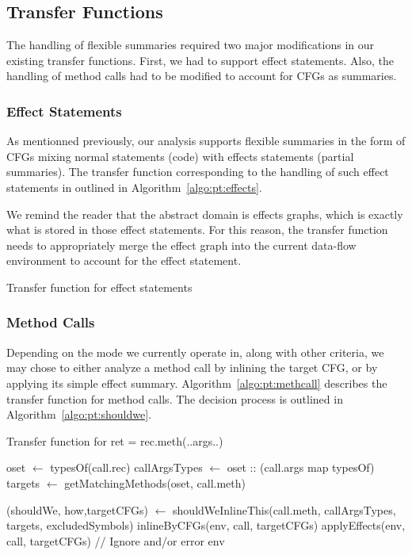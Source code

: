 \documentclass[a4paper]{article}
\begin{document}
\subsection{Transfer Functions}
The handling of flexible summaries required two major modifications in our
existing transfer functions. First, we had to support effect statements.
Also, the handling of method calls had to be modified to account for CFGs as
summaries.

\subsubsection{Effect Statements}
As mentionned previously, our analysis supports flexible summaries in the form
of CFGs mixing normal statements (code) with effects statements (partial
summaries). The transfer function corresponding to the handling of such effect
statements in outlined in Algorithm~\ref{algo:pt:effects}.

We remind the reader that the abstract domain is effects graphs, which is
exactly what is stored in those effect statements. For this reason, the
transfer function needs to appropriately merge the effect graph into the
current data-flow environment to account for the effect statement.

\begin{algorithm}
\caption{Transfer function for effect statements}\label{algo:pt:effects}
\begin{algorithmic}[1]
\EndFunction
\end{algorithmic}
\end{algorithm}

\subsubsection{Method Calls}
Depending on the mode we currently operate in, along with other criteria, we
may chose to either analyze a method call by inlining the target CFG, or by
applying its simple effect summary. Algorithm~\ref{algo:pt:methcall} describes
the transfer function for method calls. The decision process is outlined in
Algorithm~\ref{algo:pt:shouldwe}.

\begin{algorithm}
\caption{Transfer function for ret = rec.meth(..args..)}\label{algo:pt:methcall}
\begin{algorithmic}[1]
    \State oset $\gets$ typesOf(call.rec)
    \State callArgsTypes $\gets$ oset :: (call.args map typesOf)
    \State targets $\gets$ getMatchingMethods(oset, call.meth)

    \State (shouldWe, how,targetCFGs) $\gets$ shouldWeInlineThis(call.meth, callArgsTypes, targets, excludedSymbols)
            \State \Return inlineByCFGs(env, call, targetCFGs)
        \Else
            \State \Return applyEffects(env, call, targetCFGs)
        \EndIf
    \Else
        \State // Ignore and/or error
        \State \Return env
    \EndIf
\EndFunction
\end{algorithmic}
\end{algorithm}
\end{document}
